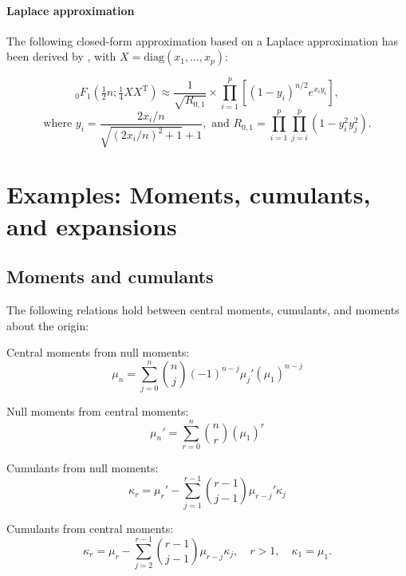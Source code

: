 \subsubsection{Laplace approximation}
The following closed-form approximation based on a Laplace approximation has been derived by \cite{Butler_Wood_2003}, with $X=\text{diag}(x_1,\ldots,x_p)$:

\begin{equation}
	{}_0{F}_1 \left(\tfrac{1}{2}n;\tfrac{1}{4}XX^{\text{T}} \right)  \approx \frac{1}{\sqrt{R_{0,1}}}  \times \prod_{i=1}^p \left[(1-y_i)^{n/2} e^{x_i y_i}  \right],
\end{equation}
\begin{equation*}
	\text{where } y_i=\frac{2x_i/n}{\sqrt{(2x_i/n)^2 + 1}+1}, \text{ and } R_{0,1} = \prod_{i=1}^p  \prod_{j=i}^p (1-y_i^2 y_j^2). 
\end{equation*}





\chapter{Examples: Moments, cumulants, and expansions}


\section{Moments and cumulants}
\label{Moments and cumulants}

The following relations hold between central moments, cumulants, and moments about the origin:

Central moments from null moments: 
\begin{equation}
	\mu_n = \sum_{j=0}^n \binom{n}{j} (-1)^{n-j} \mu_j'(\mu_1)^{n-j}
\end{equation}


Null moments from central moments: 
\begin{equation}
	\mu_n' = \sum_{r=0}^n \binom{n}{r} (\mu_1)^{r}
\end{equation}


Cumulants  from null moments: 
\begin{equation}
	\kappa_r = \mu_r' - \sum_{j=1}^{r-1} \binom{r-1}{j-1} \mu_{r-j}' \kappa_j
\end{equation}


Cumulants  from central moments: 
\begin{equation}
	\kappa_r = \mu_r - \sum_{j=2}^{r-1} \binom{r-1}{j-1} \mu_{r-j} \kappa_j, \quad r>1, \quad \kappa_1=\mu_1.
\end{equation}



